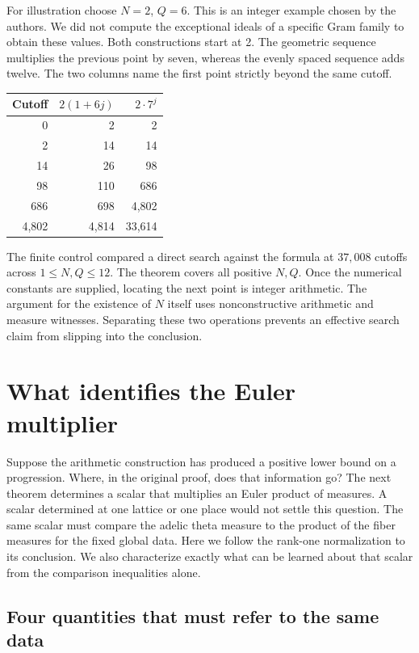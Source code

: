 \documentclass[12pt,letterpaper]{article}
\begin{document}
For illustration choose $N=2$, $Q=6$. This is an integer example chosen by the authors. We did not compute the exceptional ideals of a specific Gram family to obtain these values. Both constructions start at 2. The geometric sequence multiplies the previous point by seven, whereas the evenly spaced sequence adds twelve. The two columns name the first point strictly beyond the same cutoff.
\begin{center}\begin{tabular}{rrr}\toprule
Cutoff & $2(1+6j)$ & $2\cdot7^j$\\\midrule
0&2&2\\ 2&14&14\\ 14&26&98\\ 98&110&686\\ 686&698&4,802\\ 4,802&4,814&33,614\\\bottomrule
\end{tabular}\end{center}
The finite control compared a direct search against the formula at $37{,}008$ cutoffs across $1\le N,Q\le12$. The theorem covers all positive $N,Q$. Once the numerical constants are supplied, locating the next point is integer arithmetic. The argument for the existence of $N$ itself uses nonconstructive arithmetic and measure witnesses. Separating these two operations prevents an effective search claim from slipping into the conclusion.

\section{What identifies the Euler multiplier}

Suppose the arithmetic construction has produced a positive lower bound on a progression. Where, in the original proof, does that information go? The next theorem determines a scalar that multiplies an Euler product of measures. A scalar determined at one lattice or one place would not settle this question. The same scalar must compare the adelic theta measure to the product of the fiber measures for the fixed global data. Here we follow the rank-one normalization to its conclusion. We also characterize exactly what can be learned about that scalar from the comparison inequalities alone.

\subsection{Four quantities that must refer to the same data}
\end{document}
